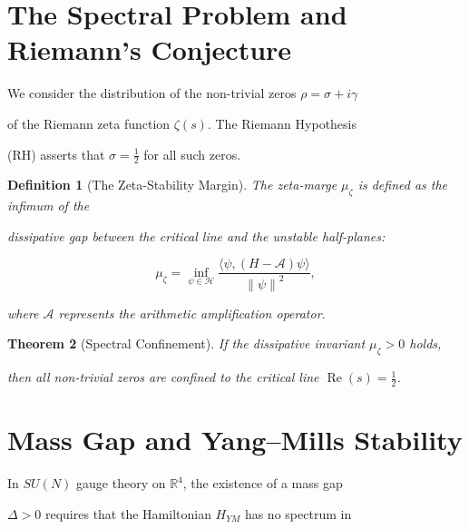 ﻿\documentclass[11pt,a4paper]{amsart}
\newtheorem{theorem}{Theorem}[section]
\newtheorem{definition}[theorem]{Definition}
\newcommand{\mumargin}{\ensuremath{\mu}}
\newcommand{\norm}[1]{\left\|#1\right\|}
\begin{document}
\section{The Spectral Problem and Riemann's Conjecture}

We consider the distribution of the non-trivial zeros $\rho = \sigma + i\gamma$

of the Riemann zeta function $\zeta(s)$. The Riemann Hypothesis

(RH) asserts that $\sigma = \tfrac{1}{2}$ for all such zeros.



\begin{definition}[The Zeta-Stability Margin]

The zeta-marge $\mumargin_{\zeta}$ is defined as the infimum of the

dissipative gap between the critical line and the unstable half-planes:

\begin{equation}

 \mumargin_{\zeta} = \inf_{\psi \in \mathcal{H}} \frac{\langle \psi, (H - \mathscr{A})\psi \rangle}{\norm{\psi}^2},

\end{equation}

where $\mathscr{A}$ represents the arithmetic amplification operator.

\end{definition}



\begin{theorem}[Spectral Confinement]

If the dissipative invariant $\mumargin_{\zeta} > 0$ holds,

then all non-trivial zeros are confined to the critical line $\operatorname{Re}(s) = \tfrac{1}{2}$.

\end{theorem}




\section{Mass Gap and Yang--Mills Stability}

In $SU(N)$ gauge theory on $\mathbb{R}^4$, the existence of a mass gap

$\Delta > 0$ requires that the Hamiltonian $H_{YM}$ has no spectrum in
\end{document}
